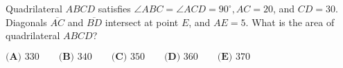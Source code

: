 Quadrilateral $ABCD$ satisfies $\angle ABC = \angle ACD = 90^{\circ}, AC = 20$, and $CD = 30$. Diagonals $\overline{AC}$ and $\overline{BD}$ intersect at point $E$, and $AE = 5$. What is the area of quadrilateral $ABCD$?

$\textbf{(A) } 330 \qquad\textbf{(B) } 340 \qquad\textbf{(C) } 350 \qquad\textbf{(D) } 360 \qquad\textbf{(E) } 370$